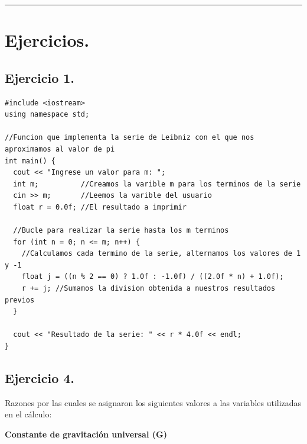 \documentclass[12pt,letterpaper]{article}
\begin{document}
\bigskip
\hrule height 0.1pt
\bigskip

\section*{Ejercicios.}

\subsection*{Ejercicio 1.}

\begin{lstlisting}[style=cppstyle, caption={Código en C++ ~ Calculador de Serie}]
#include <iostream>
using namespace std;

//Funcion que implementa la serie de Leibniz con el que nos aproximamos al valor de pi
int main() {
  cout << "Ingrese un valor para m: ";
  int m;          //Creamos la varible m para los terminos de la serie
  cin >> m;       //Leemos la varible del usuario
  float r = 0.0f; //El resultado a imprimir
  
  //Bucle para realizar la serie hasta los m terminos
  for (int n = 0; n <= m; n++) {
    //Calculamos cada termino de la serie, alternamos los valores de 1 y -1
    float j = ((n % 2 == 0) ? 1.0f : -1.0f) / ((2.0f * n) + 1.0f);
    r += j; //Sumamos la division obtenida a nuestros resultados previos 
  }
  
  cout << "Resultado de la serie: " << r * 4.0f << endl;
}
\end{lstlisting}

\newpage

\subsection*{Ejercicio 4.}

Razones por las cuales se asignaron los siguientes valores a las variables utilizadas en el cálculo:

\textbf{Constante de gravitación universal (G)}
 
\end{document}
